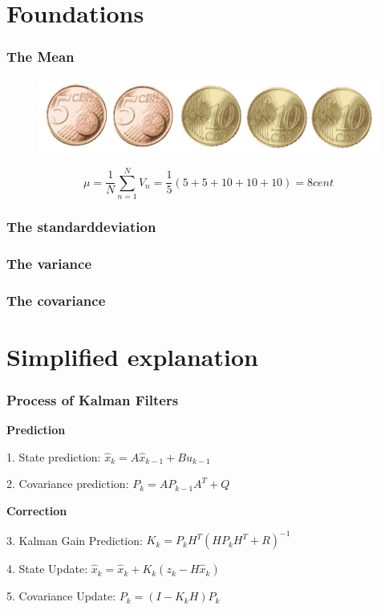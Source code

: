 \documentclass{beamer}
\begin{document}
\section{Foundations}

\begin{frame}
    \frametitle{The Mean}
    \begin{figure}
        \centering
        \includegraphics[width=1\textwidth]{images/graphics/coins.png}
    \end{figure}
    \vspace{1cm}
    \begin{equation*}
        \mu = \frac{1}{N} \sum _{n=1}^{N}V_{n}= \frac{1}{5} \left( 5+5+10+10+10 \right) = 8 cent
    \end{equation*}
\end{frame}

\begin{frame}
    \frametitle{The standarddeviation}
\end{frame}

\begin{frame}
    \frametitle{The variance}
\end{frame}

\begin{frame}
    \frametitle{The covariance}
\end{frame}

\section{Simplified explanation}

\begin{frame}
    \frametitle{Process of Kalman Filters}

    \textbf{Prediction}

    1. State prediction: \( \hat{x}_{k} = A\hat{x}_{k-1}+Bu_{k-1} \)

    2. Covariance prediction: \( P_{k}=AP_{k-1}A^{T}+Q \)

    \textbf{Correction}

    3. Kalman Gain Prediction: \( K_{k}=P_{k}H^{T}(HP_{k}H^T+R)^{-1} \)

    4. State Update: \( \hat{x}_{k}=\hat{x}_{k}+K_{k}(z_{k}-H\hat{x}_{k}) \)

    5. Covariance Update: \( P_{k}=(I-K_{k}H)P_{k} \)
\end{frame}
\end{document}
